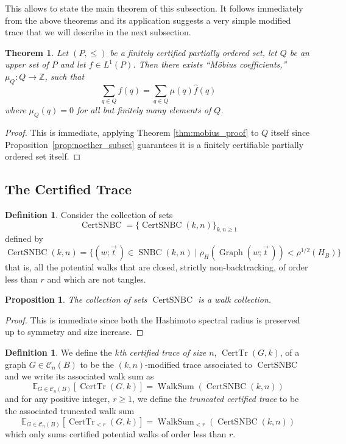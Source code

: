 \documentclass{memo-l}
\theoremstyle{plain}
\theoremstyle{definition}
\numberwithin{section}{chapter}
\numberwithin{equation}{chapter}
\newcommand{\rhoroot}[1]{\rho^{1/2}(H_{#1})}
\DeclareMathOperator{\WalkSum}{WalkSum}
\DeclareMathOperator{\CertTr}{CertTr}
\DeclareMathOperator{\Graph}{Graph}
\DeclareMathOperator{\SNBC}{SNBC}
\DeclareMathOperator{\CertSNBC}{CertSNBC}
\newcommand{\from}{\colon}
\newcommand{\potwalk}{(w;\vec t\,)}
\theoremstyle{plain}
\newtheorem{thm}[theorem]{Theorem}
\newtheorem{prop}[theorem]{Proposition}
\theoremstyle{definition}
\newtheorem{defn}[theorem]{Definition}
\newcommand\EE{\mathbb{E}}
\newcommand\ZZ{\mathbb{Z}}
\newcommand\cC{\mathcal{C}}
\begin{document}
This allows to state the main theorem of this subsection. It follows
immediately from the above theorems and its application suggests a very
simple modified trace that we will describe in the next subsection.

\begin{thm}\label{thm:main_mobius} Let \( (P,\leq) \) be a finitely
certified partially ordered set, let \( Q \) be an upper set of \( P \) and
let \( f \in L^1(P) \). Then there exists 
``M\"obius coefficients,'' \( \mu_Q
\from Q \to \ZZ \), such that \[ \sum_{q \in Q} f(q) = \sum_{q \in Q}\mu(q)
\widehat f(q) \] where \( \mu_Q(q) = 0 \) for all but finitely many
elements of \(Q\).  \end{thm} \begin{proof} This is immediate, applying
Theorem \ref{thm:mobius_proof} to \(Q\) itself since 
Proposition~\ref{prop:noether_subset} 
guarantees it is a finitely certifiable partially
ordered set itself.  \end{proof}
%
%
%
%
\subsection{The Certified Trace}


\begin{defn} Consider the collection of sets \[
\CertSNBC = \{ \CertSNBC(k,n) \}_{k,n \geq 1} \] defined by \[
\CertSNBC(k,n) = \{ \potwalk \in \SNBC(k,n) \mid \rho_H(\Graph\potwalk) <
\rhoroot B \} \] that is, all the potential walks that are closed, strictly
non-backtracking, of order less than \( r \) and which are not tangles.
\end{defn}

\begin{prop} The collection of sets \( \CertSNBC \) is a walk collection.
\end{prop} \begin{proof} This is immediate since both the Hashimoto
spectral radius is preserved up to symmetry and size increase.  \end{proof}

\begin{defn}
\label{defn:CertTr}
 We define the
\emph{\(k\)th certified trace of size \(n\)}, \( \CertTr(G,k) \), of a
graph \( G \in \cC_n(B) \) to be the \( (k,n) \)-modified trace associated
to \( \CertSNBC \) and we write its associated walk sum as \[
\EE_{G\in\cC_n(B)}[\CertTr(G,k)] = \WalkSum(\CertSNBC(k,n) ) \] and for any positive
integer, \( r \geq 1 \), we define the \emph{truncated certified trace} to
be the associated truncated walk sum \[ \EE_{G\in\cC_n(B)}[\CertTr_{<r}(G,k)] =
\WalkSum_{<r}(\CertSNBC(k,n)) \] which only sums certified potential walks
of order less than \(r\).  \end{defn}
\end{document}

